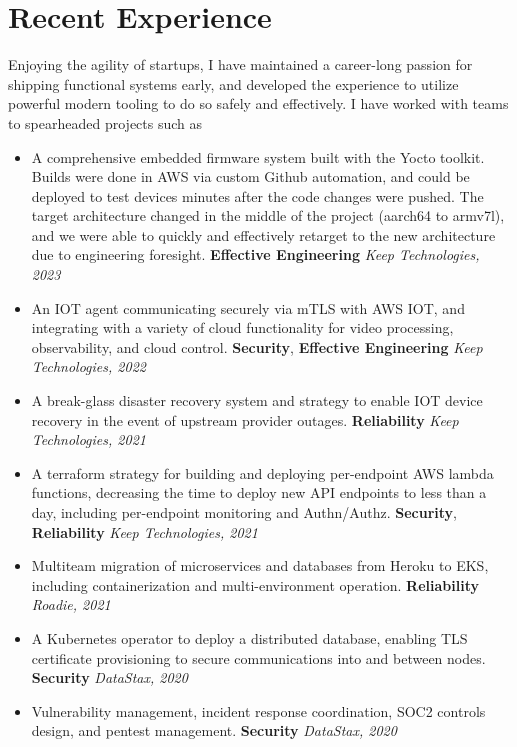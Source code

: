 \documentclass[letterpaper,11pt]{article}
\begin{document}
\section{Recent Experience}
Enjoying the agility of startups, I have maintained a
career-long passion for shipping functional systems early, and developed the experience to
utilize powerful modern tooling to do so safely and effectively. I have
worked with teams to spearheaded projects such as
\begin{itemize}
	\setlength\itemsep{0.1em}
	\item A comprehensive embedded firmware system built with the Yocto toolkit. Builds were done in AWS via custom Github automation, and could be deployed to test devices minutes after the code changes were pushed. The target architecture
	      changed in the middle of the project (aarch64 to armv7l), and we were able to quickly and effectively retarget to the new architecture due to engineering foresight. \textbf{Effective Engineering} \textit{Keep Technologies, 2023}
	\item An IOT agent communicating securely via mTLS with AWS IOT, and integrating with a variety of cloud functionality for video processing, observability, and cloud control. \textbf{Security}, \textbf{Effective Engineering} \textit{Keep Technologies, 2022}
	\item A break-glass disaster recovery system and strategy to enable IOT device recovery in the event of upstream provider outages. \textbf{Reliability} \textit{Keep Technologies, 2021}
	\item A terraform strategy for building and deploying per-endpoint AWS lambda functions, decreasing the time to deploy new API endpoints to less than a day, including per-endpoint monitoring and Authn/Authz. \textbf{Security}, \textbf{Reliability} \textit{Keep Technologies, 2021}
	\item Multiteam migration of microservices and databases from Heroku to EKS, including containerization and multi-environment operation. \textbf{Reliability} \textit{Roadie, 2021}
	\item A Kubernetes operator to deploy a distributed database, enabling TLS certificate provisioning to secure communications into and between nodes. \textbf{Security} \textit{DataStax, 2020}
	\item Vulnerability management, incident response coordination, SOC2 controls design, and pentest management. \textbf{Security} \textit{DataStax, 2020}
\end{itemize}
\end{document}

